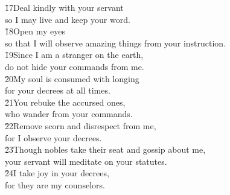 \begin{poetry}
\poeml \v{17}Deal kindly with your servant \\
\poemll    so I may live and keep your word. \\
\poeml \v{18}Open my eyes \\
\poemll    so that I will observe amazing things from your instruction. \\
\poeml \v{19}Since I am a stranger on the earth, \\
\poemll    do not hide your commands from me. \\
\poeml \v{20}My soul is consumed with longing \\
\poemll    for your decrees at all times. \\
\poeml \v{21}You rebuke the accursed ones, \\
\poemll    who wander from your commands. \\
\poeml \v{22}Remove scorn and disrespect from me, \\
\poemll    for I observe your decrees. \\
\poeml \v{23}Though nobles take their seat and gossip about me, \\
\poemll    your servant will meditate on your statutes. \\
\poeml \v{24}I take joy in your decrees, \\
\poemll    for they are my counselors.
\end{poetry}

